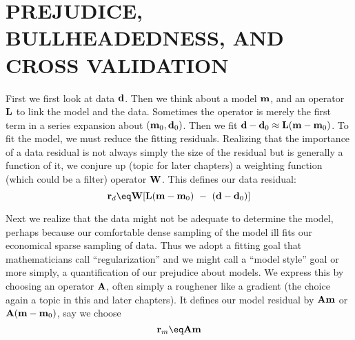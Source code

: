 \section{PREJUDICE, BULLHEADEDNESS, AND CROSS VALIDATION}

First we first look at data $\bold d$.
Then we think about a model $\bold m$,
and an operator $\bold L$ to link the model and the data.
Sometimes the operator is merely the first term in a series expansion
about $(\bold m_0,\bold d_0)$.
Then we fit
$\bold d-\bold d_0 \approx \bold L ( \bold m-\bold m_0)$.
To fit the model, we must reduce the fitting residuals.
Realizing that the importance of a data residual
is not always simply the size of the residual
but is generally a function of it,
we conjure up (topic for later chapters)
a weighting function (which could be a filter) operator $\bold W$.
This defines our data residual:
\begin{equation}
\bold r_d \eq \bold W
[ \bold L
        ( \bold m-\bold m_0)
\ -\ 
        ( \bold d-\bold d_0)
]
\end{equation}

\par
Next we realize that the data might not be adequate to determine the model,
perhaps because our comfortable dense sampling of the model
ill fits our economical sparse sampling of data.
Thus we adopt a fitting goal that mathematicians call ``regularization''
and we might call a ``model style'' goal
or more simply,
a quantification of our prejudice about models.
We express this by choosing an operator $\bold A$,
often simply a roughener like a gradient
(the choice again a topic in this and later chapters).
It defines our model residual by
$\bold A \bold m$ or
$\bold A ( \bold m-\bold m_0)$, say we choose
\begin{equation}
\bold r_m \eq \bold A \bold m 
\end{equation}

